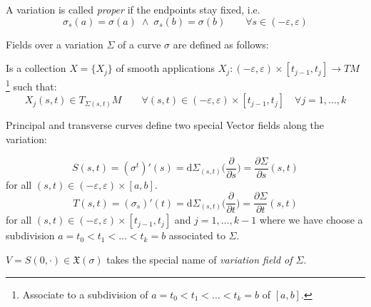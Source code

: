 \documentclass[a4paper,12pt]{scrartcl}    %
\begin{document}
 \begin{notationfix}
  A variation is called \emph{proper} if the endpoints stay fixed, i.e.
  \begin{displaymath}
   \sigma_s(a)= \sigma(a) \; \wedge \; \sigma_s(b) = \sigma(b) \qquad \forall s\in (-\varepsilon, \varepsilon)
  \end{displaymath}
 \end{notationfix}

Fields over a variation $\Sigma$ of a curve $\sigma$ are defined as follows:

 \begin{definition}
  Is a collection $X= \{X_j \}$ of smooth applications $X_j:(-\varepsilon, \varepsilon) \times [t_{j-1},t_{j}]\rightarrow TM$ \footnote{Associate to a subdivision of $ a= t_0 < t_1 < \ldots < t_k=b$ of $[a,b]$. } such that:
  \begin{displaymath}
   X_j (s,t) \in T_{\Sigma(s,t)}M \qquad \forall (s,t) \in (-\varepsilon, \varepsilon) \times [t_{j-1},t_{j}]
   \quad \forall j= 1, \ldots, k
  \end{displaymath}
 \end{definition}
 

Principal and  transverse curves define two special Vector fields along the variation:
\begin{definition}\label{Def: Variation Field}
 \begin{displaymath}
  S(s,t) = (\sigma^t)'(s) = \textrm{d}\Sigma_{(s,t)} \big( \frac{\partial}{\partial s} \big) = 
  \frac{\partial \Sigma}{\partial s} (s,t)
 \end{displaymath}
 for all $(s,t) \in (-\varepsilon, \varepsilon) \times [a,b] $.
 \begin{displaymath}
    T(s,t) = (\sigma_s)'(t) = \textrm{d}\Sigma_{(s,t)} \big( \frac{\partial}{\partial t} \big) = 
  \frac{\partial \Sigma}{\partial t} (s,t)
 \end{displaymath}
 for all $(s,t) \in (-\varepsilon, \varepsilon) \times [t_{j-1},t_{j}] $ and $j=1, \ldots, k-1$ 
 where we have choose  a subdivision $ a= t_0 < t_1 < \ldots < t_k=b$ associated to $\Sigma$.
\end{definition}
 
\begin{notationfix}
 $V= S(0,\cdot) \in \mathfrak{X}(\sigma)$ takes the special name of \emph{variation field of $\Sigma$}.
\end{notationfix}
\end{document}
